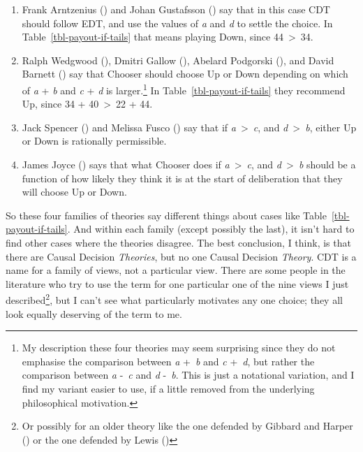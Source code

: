 \documentclass[
  10pt,
  letterpaper,
  DIV=11,
  numbers=noendperiod,
  twoside]{scrartcl}
\providecommand{\tightlist}{%
  \setlength{\itemsep}{0pt}\setlength{\parskip}{0pt}}\usepackage{longtable,booktabs,array}
\begin{document}
\begin{enumerate}
\def\labelenumi{\arabic{enumi}.}
\tightlist
\item
  Frank Arntzenius () and Johan
  Gustafsson () say that in this case
  CDT should follow EDT, and use the values of \emph{a} and \emph{d} to
  settle the choice. In Table~\ref{tbl-payout-if-tails} that means
  playing Down, since 44~\textgreater~34.
\item
  Ralph Wedgwood (), Dmitri Gallow
  (), Abelard Podgorski
  (), and David Barnett
  () say that Chooser should choose Up
  or Down depending on which of \emph{a} + \emph{b} and \emph{c} +
  \emph{d} is larger.\footnote{My description these four theories may
    seem surprising since they do not emphasise the comparison between
    \emph{a} +~\emph{b} and \emph{c} +~\emph{d}, but rather the
    comparison between \emph{a} -~\emph{c} and \emph{d} -~\emph{b}. This
    is just a notational variation, and I find my variant easier to use,
    if a little removed from the underlying philosophical motivation.}
  In Table~\ref{tbl-payout-if-tails} they recommend Up, since 34 +
  40~\textgreater~22 + 44.
\item
  Jack Spencer () and Melissa Fusco
  () say that if
  \emph{a}~\textgreater~\emph{c}, and \emph{d}~\textgreater~\emph{b},
  either Up or Down is rationally permissible.
\item
  James Joyce () says that what Chooser
  does if \emph{a}~\textgreater~\emph{c}, and
  \emph{d}~\textgreater~\emph{b} should be a function of how likely they
  think it is at the start of deliberation that they will choose Up or
  Down.
\end{enumerate}

So these four families of theories say different things about cases like
Table~\ref{tbl-payout-if-tails}. And within each family (except possibly
the last), it isn't hard to find other cases where the theories
disagree. The best conclusion, I think, is that there are Causal
Decision \emph{Theories}, but no one Causal Decision \emph{Theory}. CDT
is a name for a family of views, not a particular view. There are some
people in the literature who try to use the term for one particular one
of the nine views I just described\footnote{Or possibly for an older
  theory like the one defended by Gibbard and Harper
  () or the one defended by Lewis
  ()}, but I can't see what
particularly motivates any one choice; they all look equally deserving
of the term to me.
\end{document}
